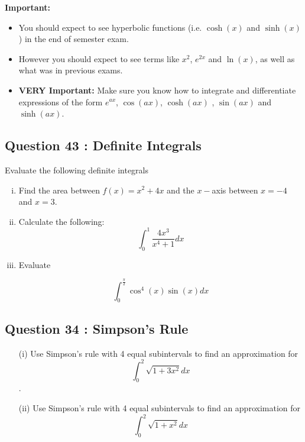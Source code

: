 \documentclass[]{article}
\begin{document}
\newpage
\begin{framed}
	\noindent \textbf{Important:	}
	\begin{itemize}
		\item You should expect to see hyperbolic functions (i.e. $\cosh(x)$ and $\sinh(x)$)  in the end of semester exam. 
		\item However you should expect to see terms like $ x^2$, $e^{2x}$ and $ \ln(x)$, as well as what was in previous exams.
		\item \textbf{VERY Important:} Make sure you know how to integrate and differentiate expressions of the form $e^{ax}$, $\cos(ax)$, $\cosh(ax)$ , $\sin(ax)$ and $\sinh(ax)$. 
	\end{itemize}
\end{framed}

\subsection*{Question 43 : Definite Integrals}
Evaluate the following definite integrals 

\begin{enumerate}[(i)]
	
	\item 
	Find the area between $f(x) = x^2 + 4x $ and the $x-$axis between 
	$x=-4$   and $ x=3$.
	
	\item Calculate the following:
	\[ \int^{1}_{0} \frac{4x^3}{x^4+1} dx \]
	
	
	\item Evaluate 
	
	\[ \int^{\frac{\pi}{2}}_{0} \cos^4(x) \sin(x) dx \]
\end{enumerate}




\subsection*{Question 34 : Simpson's Rule}
\begin{itemize}
	\item[(i)] 
	Use Simpson’s rule with 4 equal subintervals to find an approximation       
	for  \[ \int^{2}_{0} \sqrt{1+3x^2} dx \]  .	
	\item[(ii)] Use Simpson’s rule with 4 equal subintervals to find an approximation       
	for    \[ \int^2_0 \sqrt{1+x^2} dx \] 
\end{itemize}
\end{document}
